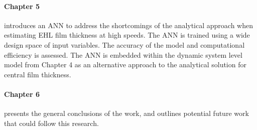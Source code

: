 \paragraph{Chapter 5} introduces an ANN  to address the shortcomings of the analytical approach when estimating EHL film thickness at high speeds. The ANN is trained using a wide design space of input variables. The accuracy of the model and computational efficiency is assessed. The ANN is embedded within the dynamic system level model from Chapter 4 as an alternative approach to the analytical solution for central film thickness. 

\paragraph{Chapter 6} presents the general conclusions of the work, and outlines potential future work that could follow this research.